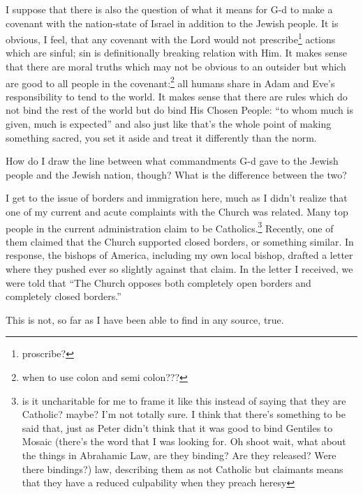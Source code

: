 \documentclass[12pt]{article}
\newcommand{\say}[1]{``#1''}
\renewcommand{\,}{\textsuperscript{,}}
\begin{document}
I suppose that there is also the question of what it means for G-d to make a covenant with the nation-state of Israel in addition to the Jewish people.  
It is obvious, I feel, that any covenant with the Lord would not prescribe\footnote{proscribe?} actions which are sinful; sin is definitionally breaking relation with Him.  
It makes sense that there are moral truths which may not be obvious to an outsider but which are good to all people in the covenant:\footnote{when to use colon and semi colon???} all humans share in Adam and Eve's responsibility to tend to the world.  
It makes sense that there are rules which do not bind the rest of the world but do bind His Chosen People: \say{to whom much is given, much is expected} and also just like that's the whole point of making something sacred, you set it aside and treat it differently than the norm.

How do I draw the line between what commandments G-d gave to the Jewish people and the Jewish nation, though?  
What is the difference between the two?

I get to the issue of borders and immigration here, much as I didn't realize that one of my current and acute complaints with the Church was related.  
Many top people in the current administration claim to be Catholics.\footnote{is it uncharitable for me to frame it like this instead of saying that they are Catholic? maybe? I'm not totally sure. I think that there's something to be said that, just as Peter didn't think that it was good to bind Gentiles to Mosaic (there's the word that I was looking for. Oh shoot wait, what about the things in Abrahamic Law, are they binding? Are they released? Were there bindings?) law, describing them as not Catholic but claimants means that they have a reduced culpability when they preach heresy}  
Recently, one of them claimed that the Church supported closed borders, or something similar.  
In response, the bishops of America, including my own local bishop, drafted a letter where they pushed ever so slightly against that claim.  
In the letter I received, we were told that \say{The Church opposes both completely open borders and completely closed borders.}

This is not, so far as I have been able to find in any source, true.
\end{document}
